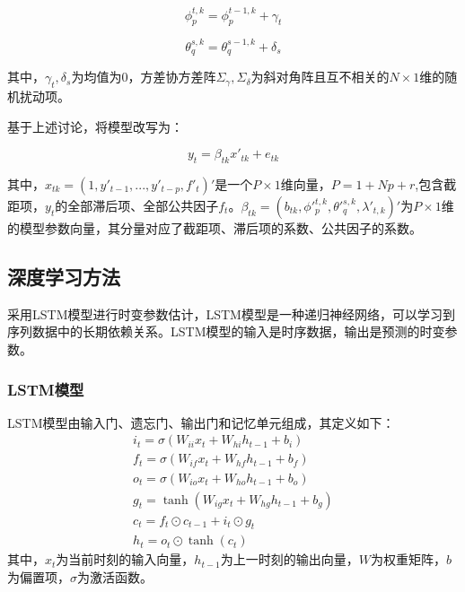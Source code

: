 \documentclass[12pt,a4paper]{article}
\begin{document}
\begin{equation}
    \phi_{p}^{t,k}=\phi_p^{t-1,k}+\gamma_t 
\end{equation}

\begin{equation}
    \theta_{q}^{s,k}=\theta_q^{s-1,k}+\delta_s
\end{equation}

其中，$\gamma_t,\delta_s$为均值为0，方差协方差阵$\Sigma_\gamma,\Sigma_\delta$为斜对角阵且互不相关的$N \times 1$维的随机扰动项。

基于上述讨论，将模型改写为：

\begin{equation}
y_t = \beta_{tk} x'_{tk}+e_{tk}
\end{equation}

其中，$x_{tk}=(1,y'_{t-1},...,y'_{t-p},f'_{t})'$是一个$P \times 1$维向量，$P=1+Np+r$,包含截距项，$y_t$的全部滞后项、全部公共因子$f_t$。$\beta_{tk}=(b_{tk},\phi'_{p}^{t,k},\theta'_{q}^{s,k},\lambda'_{t,k})'$为$P \times 1$维的模型参数向量，其分量对应了截距项、滞后项的系数、公共因子的系数。
\subsection{深度学习方法}
采用LSTM模型进行时变参数估计，LSTM模型是一种递归神经网络，可以学习到序列数据中的长期依赖关系。LSTM模型的输入是时序数据，输出是预测的时变参数。
\subsubsection{LSTM模型}
LSTM模型由输入门、遗忘门、输出门和记忆单元组成，其定义如下：
\begin{equation}
    \begin{array}{ll}
        i_t = \sigma(W_{ii} x_t + W_{hi} h_{t-1} + b_i) \\
        f_t = \sigma(W_{if} x_t + W_{hf} h_{t-1} + b_f) \\
        o_t = \sigma(W_{io} x_t + W_{ho} h_{t-1} + b_o) \\
        g_t = \tanh(W_{ig} x_t + W_{hg} h_{t-1} + b_g) \\
        c_t = f_t \odot c_{t-1} + i_t \odot g_t \\
        h_t = o_t \odot \tanh(c_t)
    \end{array}
\end{equation}
其中，$x_t$为当前时刻的输入向量，$h_{t-1}$为上一时刻的输出向量，$W$为权重矩阵，$b$为偏置项，$\sigma$为激活函数。
\end{document}
